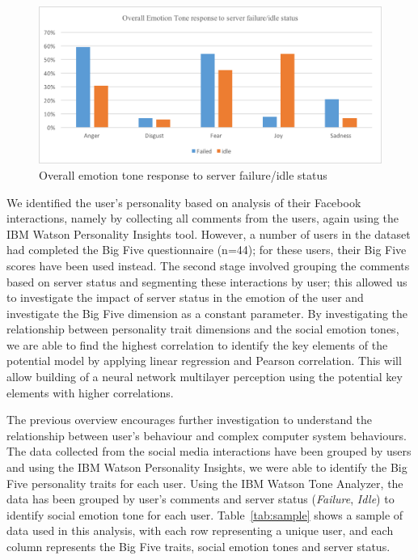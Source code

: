 \documentclass[graybox]{svmult}
\begin{document}
{\begin{figure}[!ht]
\centering
\includegraphics[width=\columnwidth]{images/emotiontone}
\caption{Overall emotion tone response to server failure/idle status}
\label{fig:emotiontone} 
\end{figure}

We identified the user's personality based on analysis of their
Facebook interactions, namely by collecting all comments from the
users, again using the IBM Watson Personality Insights tool. However,
a number of users in the dataset had completed the Big Five
questionnaire (n=44); for these users, their Big Five scores have
been used instead. The second stage involved grouping the comments
based on server status and segmenting these interactions by user; this
allowed us to investigate the impact of server status in the emotion
of the user and investigate the Big Five dimension as a constant
parameter. By investigating the relationship between personality trait
dimensions and the social emotion tones, we are able to find the
highest correlation to identify the key elements of the potential
model by applying linear regression and Pearson correlation. This will
allow building of a neural network multilayer perception using the
potential key elements with higher correlations.

The previous overview encourages further investigation to understand
the relationship between user's behaviour and complex computer system
behaviours. The data collected from the social media interactions have
been grouped by users and using the IBM Watson Personality Insights,
we were able to identify the Big Five personality traits for each
user. Using the IBM Watson Tone Analyzer, the data has been grouped by
user's comments and server status ({\emph{Failure}}, {\emph{Idle}}) to
identify social emotion tone for each user. Table~\ref{tab:sample}
shows a sample of data used in this analysis, with each row
representing a unique user, and each column represents the Big Five
traits, social emotion tones and server status.

}
\end{document}
